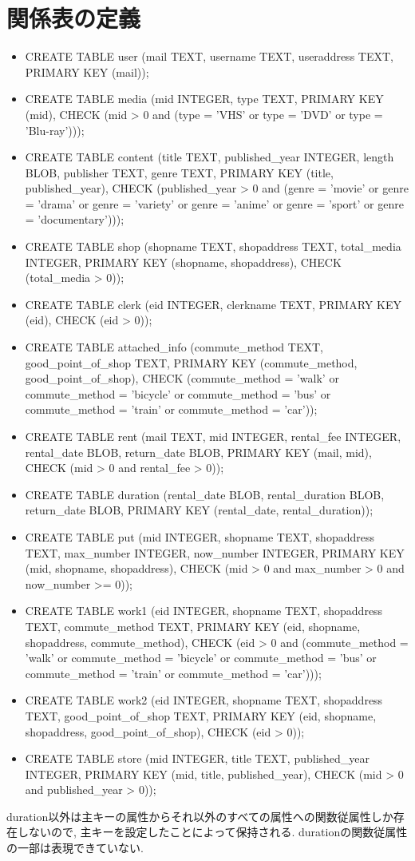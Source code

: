 \documentclass{jarticle}
\begin{document}
\section{関係表の定義}
\begin{itemize}
\item CREATE TABLE user (mail TEXT, username TEXT, useraddress TEXT, PRIMARY KEY (mail));
\item CREATE TABLE media (mid INTEGER, type TEXT, PRIMARY KEY (mid), CHECK (mid > 0 and (type = 'VHS' or type = 'DVD' or type = 'Blu-ray')));
\item CREATE TABLE content (title TEXT, published\_year INTEGER, length BLOB, publisher TEXT, genre TEXT, PRIMARY KEY (title, published\_year), CHECK (published\_year > 0 and (genre = 'movie' or genre = 'drama' or genre = 'variety' or genre = 'anime' or genre = 'sport' or genre = 'documentary')));
\item CREATE TABLE shop (shopname TEXT, shopaddress TEXT, total\_media INTEGER, PRIMARY KEY (shopname, shopaddress), CHECK (total\_media > 0));
\item CREATE TABLE clerk (eid INTEGER, clerkname TEXT, PRIMARY KEY (eid), CHECK (eid > 0));
\item CREATE TABLE attached\_info (commute\_method TEXT, good\_point\_of\_shop TEXT, PRIMARY KEY (commute\_method, good\_point\_of\_shop), CHECK (commute\_method = 'walk' or commute\_method = 'bicycle' or commute\_method = 'bus' or commute\_method = 'train' or commute\_method = 'car'));
\item CREATE TABLE rent (mail TEXT, mid INTEGER, rental\_fee INTEGER, rental\_date BLOB, return\_date BLOB, PRIMARY KEY (mail, mid), CHECK (mid > 0 and rental\_fee > 0));
\item CREATE TABLE duration (rental\_date BLOB, rental\_duration BLOB, return\_date BLOB, PRIMARY KEY (rental\_date, rental\_duration));
\item CREATE TABLE put (mid INTEGER, shopname TEXT, shopaddress TEXT, max\_number INTEGER, now\_number INTEGER, PRIMARY KEY (mid, shopname, shopaddress), CHECK (mid > 0 and max\_number > 0 and now\_number >= 0));
\item CREATE TABLE work1 (eid INTEGER, shopname TEXT, shopaddress TEXT, commute\_method TEXT, PRIMARY KEY (eid, shopname, shopaddress, commute\_method), CHECK (eid > 0 and (commute\_method = 'walk' or commute\_method = 'bicycle' or commute\_method = 'bus' or commute\_method = 'train' or commute\_method = 'car')));
\item CREATE TABLE work2 (eid INTEGER, shopname TEXT, shopaddress TEXT, good\_point\_of\_shop TEXT, PRIMARY KEY (eid, shopname, shopaddress, good\_point\_of\_shop), CHECK (eid > 0));
\item CREATE TABLE store (mid INTEGER, title TEXT, published\_year INTEGER, PRIMARY KEY (mid, title, published\_year), CHECK (mid > 0 and published\_year > 0));
\end{itemize}
duration以外は主キーの属性からそれ以外のすべての属性への関数従属性しか存在しないので, 主キーを設定したことによって保持される. durationの関数従属性の一部は表現できていない.
\end{document}
